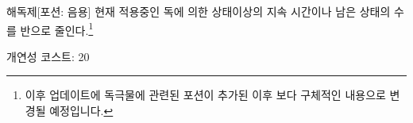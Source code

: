 \documentclass{report}
\begin{document}
	\begin{story}{해독제}{[포션: 음용]}
		현재 적용중인 독에 의한 상태이상의 지속 시간이나 남은 상태의 수를 반으로 줄인다.\footnote{이후 업데이트에 독극물에 관련된 포션이 추가된 이후 보다 구체적인 내용으로 변경될 예정입니다.}
		
		개연성 코스트: 20
	\end{story}
\end{document}
